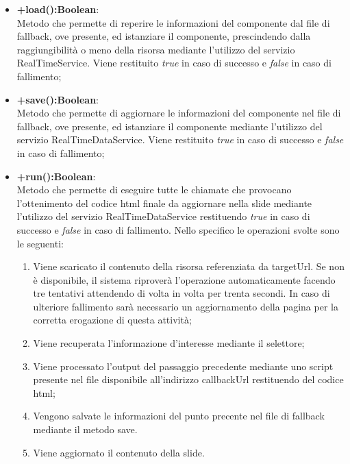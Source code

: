 \begin{itemize}
	\item \textbf{+load():Boolean}:\\	
		Metodo che permette di reperire le informazioni del componente dal file di fallback, ove presente, ed istanziare il componente, prescindendo dalla raggiungibilità o meno della risorsa mediante l'utilizzo del servizio RealTimeService. Viene restituito \textit{true} in caso di successo e \textit{false} in caso di fallimento;
		
	\item \textbf{+save():Boolean}:\\	
		Metodo che permette di aggiornare le informazioni del componente nel file di fallback, ove presente, ed istanziare il componente mediante l'utilizzo del servizio RealTimeDataService. Viene restituito \textit{true} in caso di successo e \textit{false} in caso di fallimento;
		
	\item \textbf{+run():Boolean}:\\
		Metodo che permette di eseguire tutte le chiamate che provocano l'ottenimento del codice html finale da aggiornare nella slide mediante l'utilizzo del servizio RealTimeDataService restituendo \textit{true} in caso di successo e \textit{false} in caso di fallimento.
		Nello specifico le operazioni svolte sono le seguenti:
		\begin{enumerate}
			\item Viene scaricato il contenuto della risorsa referenziata da targetUrl. Se non è disponibile, il sistema riproverà l'operazione automaticamente facendo tre tentativi attendendo di volta in volta per trenta secondi. In caso di ulteriore fallimento sarà necessario un aggiornamento della pagina per la corretta erogazione di questa attività;
			\item Viene recuperata l'informazione d'interesse mediante il selettore;
			\item Viene processato l'output del passaggio precedente mediante uno script presente nel file disponibile all'indirizzo callbackUrl restituendo del codice html;
			\item Vengono salvate le informazioni del punto precente nel file di fallback mediante il metodo save.
			\item Viene aggiornato il contenuto della slide.
		\end{enumerate}
	
	\end{itemize}
